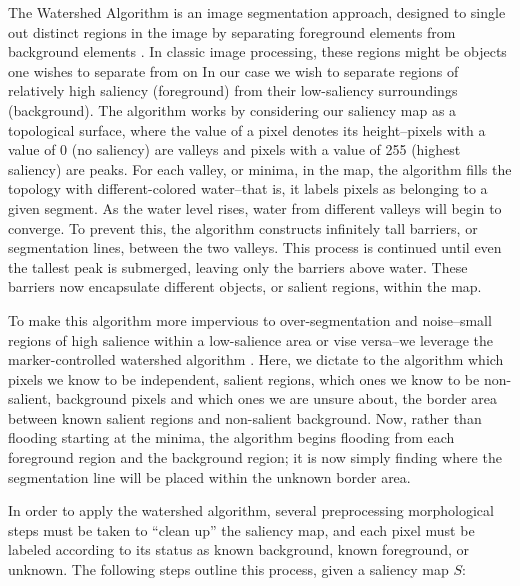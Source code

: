 The Watershed Algorithm is an image segmentation approach, designed to single out distinct regions in the image by separating foreground elements from background elements \cite{barnes2014priority}. In classic image processing, these regions might be objects one wishes to separate from on In our case we wish to separate regions of relatively high saliency (foreground) from their low-saliency surroundings (background). The algorithm works by considering our saliency map as a topological surface, where the value of a pixel denotes its height--pixels with a value of 0 (no saliency) are valleys and pixels with a value of 255 (highest saliency) are peaks. For each valley, or minima, in the map, the algorithm fills the topology with different-colored water--that is, it labels pixels as belonging to a given segment. As the water level rises, water from different valleys will begin to converge. To prevent this, the algorithm constructs infinitely tall barriers, or segmentation lines, between the two valleys. This process is continued until even the tallest peak is submerged, leaving only the barriers above water. These barriers now encapsulate different objects, or salient regions, within the map. 

To make this algorithm more impervious to over-segmentation and noise--small regions of high salience within a low-salience area or vise versa--we leverage the marker-controlled watershed algorithm \cite{roerdink2000watershed}. Here, we dictate to the algorithm which pixels we know to be independent, salient regions, which ones we know to be non-salient, background pixels and which ones we are unsure about, the border area between known salient regions and non-salient background. Now, rather than flooding starting at the minima, the algorithm begins flooding from each foreground region and the background region; it is now simply finding where the segmentation line will be placed within the unknown border area.

In order to apply the watershed algorithm, several preprocessing morphological steps must be taken to “clean up” the saliency map, and each pixel must be labeled according to its status as known background, known foreground, or unknown. The following steps outline this process, given a saliency map $S$:

